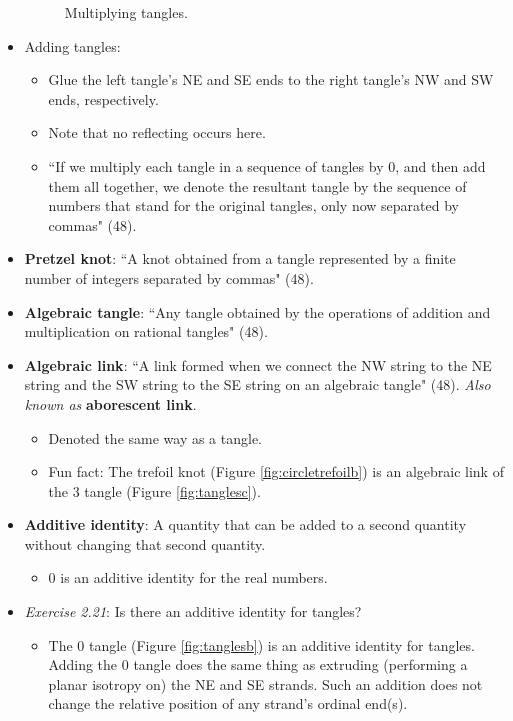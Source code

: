 \documentclass[titlepage]{article}
\numberwithin{figure}{section}
\numberwithin{table}{section}
\numberwithin{equation}{section}
\newcommand{\dq}[2]{``#1" (#2).}
\begin{document}
\begin{itemize}
\begin{figure}[h!]
        \caption{Multiplying tangles.}
        \label{fig:tanglemultiply}
    \end{figure}
    \item Adding tangles:
    \begin{itemize}
        \item Glue the left tangle's NE and SE ends to the right tangle's NW and SW ends, respectively.
        \item Note that no reflecting occurs here.
        \item \dq{If we multiply each tangle in a sequence of tangles by 0, and then add them all together, we denote the resultant tangle by the sequence of numbers that stand for the original tangles, only now separated by commas}{48}
    \end{itemize}
    \item \textbf{Pretzel knot}: \dq{A knot obtained from a tangle represented by a finite number of integers separated by commas}{48}
    \item \textbf{Algebraic tangle}: \dq{Any tangle obtained by the operations of addition and multiplication on rational tangles}{48}
    \item \textbf{Algebraic link}: \dq{A link formed when we connect the NW string to the NE string and the SW string to the SE string on an algebraic tangle}{48} \emph{Also known as} \textbf{aborescent link}.
    \begin{itemize}
        \item Denoted the same way as a tangle.
        \item Fun fact: The trefoil knot (Figure \ref{fig:circletrefoilb}) is an algebraic link of the 3 tangle (Figure \ref{fig:tanglesc}).
    \end{itemize}
    \item \textbf{Additive identity}: A quantity that can be added to a second quantity without changing that second quantity.
    \begin{itemize}
        \item 0 is an additive identity for the real numbers.
    \end{itemize}
    \item \emph{Exercise 2.21}: Is there an additive identity for tangles?
    \begin{itemize}
        \item The 0 tangle (Figure \ref{fig:tanglesb}) is an additive identity for tangles. Adding the 0 tangle does the same thing as extruding (performing a planar isotropy on) the NE and SE strands. Such an addition does not change the relative position of any strand's ordinal end(s).

\end{itemize}
\end{itemize}
\end{document}
